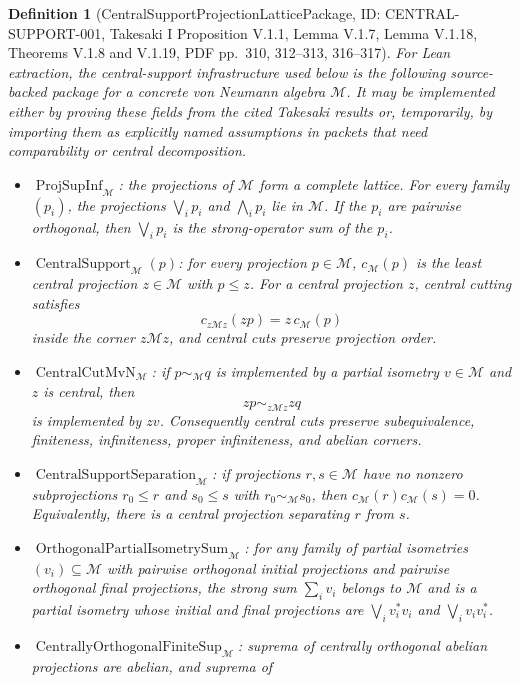 \documentclass{article}
\newtheorem{definition}{Definition}
\newcommand{\cM}{\mathcal M}
\begin{document}
\begin{definition}[CentralSupportProjectionLatticePackage, ID: CENTRAL-SUPPORT-001, Takesaki I Proposition V.1.1, Lemma V.1.7, Lemma V.1.18, Theorems V.1.8 and V.1.19, PDF pp.~310, 312--313, 316--317]
For Lean extraction, the central-support infrastructure used below is the
following source-backed package for a concrete von Neumann algebra \(\cM\).
It may be implemented either by proving these fields from the cited Takesaki
results or, temporarily, by importing them as explicitly named assumptions in
packets that need comparability or central decomposition.
\begin{itemize}
\item \(\operatorname{ProjSupInf}_{\cM}\): the projections of \(\cM\) form a
complete lattice.  For every family \((p_i)\), the projections
\(\bigvee_i p_i\) and \(\bigwedge_i p_i\) lie in \(\cM\).  If the \(p_i\)
are pairwise orthogonal, then \(\bigvee_i p_i\) is the strong-operator sum of
the \(p_i\).
\item \(\operatorname{CentralSupport}_{\cM}(p)\): for every projection
\(p\in\cM\), \(c_{\cM}(p)\) is the least central projection \(z\in\cM\) with
\(p\le z\).  For a central projection \(z\), central cutting satisfies
\[
  c_{z\cM z}(zp)=z\,c_{\cM}(p)
\]
inside the corner \(z\cM z\), and central cuts preserve projection order.
\item \(\operatorname{CentralCutMvN}_{\cM}\): if \(p\sim_{\cM}q\) is
implemented by a partial isometry \(v\in\cM\) and \(z\) is central, then
\[
  zp\sim_{z\cM z} zq
\]
is implemented by \(zv\).  Consequently central cuts preserve
subequivalence, finiteness, infiniteness, proper infiniteness, and abelian
corners.
\item \(\operatorname{CentralSupportSeparation}_{\cM}\): if projections
\(r,s\in\cM\) have no nonzero subprojections \(r_0\le r\) and \(s_0\le s\)
with \(r_0\sim_{\cM}s_0\), then \(c_{\cM}(r)c_{\cM}(s)=0\).  Equivalently,
there is a central projection separating \(r\) from \(s\).
\item \(\operatorname{OrthogonalPartialIsometrySum}_{\cM}\): for any family
of partial isometries \((v_i)\subseteq\cM\) with pairwise orthogonal initial
projections and pairwise orthogonal final projections, the strong sum
\(\sum_i v_i\) belongs to \(\cM\) and is a partial isometry whose initial and
final projections are \(\bigvee_i v_i^*v_i\) and \(\bigvee_i v_i v_i^*\).
\item \(\operatorname{CentrallyOrthogonalFiniteSup}_{\cM}\): suprema of
centrally orthogonal abelian projections are abelian, and suprema of

\end{itemize}
\end{definition}
\end{document}
